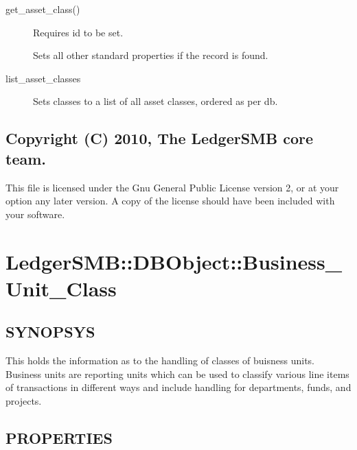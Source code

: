 \begin{description}
\begin{description}
\begin{description}
\begin{description}
\begin{description}
\begin{description}
\begin{description}
\begin{description}
\begin{description}
\begin{description}
\begin{description}
\item[{get\_asset\_class()}] \mbox{}

Requires id to be set.



Sets all other standard properties if the record is found.


\item[{list\_asset\_classes}] \mbox{}

Sets classes to a list of all asset classes, ordered as per db.

\end{description}
\subsection*{Copyright (C) 2010, The LedgerSMB core team.\label{LedgerSMB::DBObject::Asset_Class_Copyright_C_2010_The_LedgerSMB_core_team_}}


This file is licensed under the Gnu General Public License version 2, or at your
option any later version.  A copy of the license should have been included with
your software.

\section{LedgerSMB::DBObject::Business\_Unit\_Class\label{LedgerSMB::DBObject::Business_Unit_Class}}




\subsection*{SYNOPSYS\label{LedgerSMB::DBObject::Business_Unit_Class_SYNOPSYS}}


This holds the information as to the handling of classes of buisness units.  
Business units are reporting units which can be used to classify various line 
items of transactions in different ways and include handling for departments, 
funds, and projects.

\subsection*{PROPERTIES\label{LedgerSMB::DBObject::Business_Unit_Class_PROPERTIES}}
\begin{description}


\end{description}
\end{description}
\end{description}
\end{description}
\end{description}
\end{description}
\end{description}
\end{description}
\end{description}
\end{description}
\end{description}
